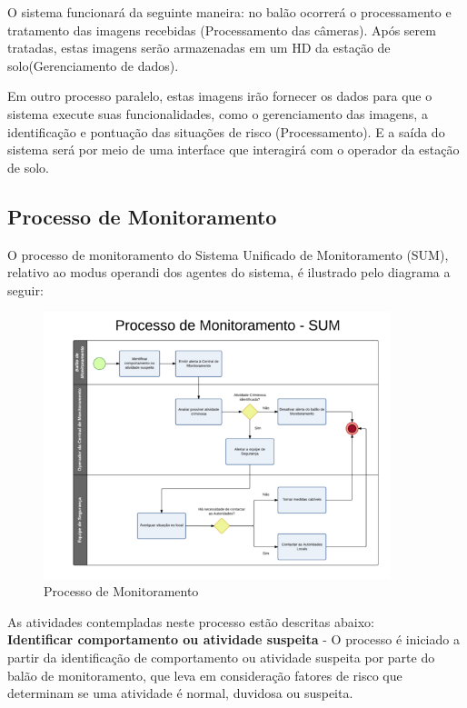 O sistema funcionará da seguinte maneira: no balão ocorrerá o processamento e tratamento das imagens recebidas (Processamento das câmeras). Após serem tratadas, estas imagens serão armazenadas em um HD da estação de solo(Gerenciamento de dados).

Em outro processo paralelo, estas imagens  irão fornecer os dados para que o sistema execute suas funcionalidades, como o gerenciamento das imagens, a identificação e pontuação das situações de risco (Processamento). E a saída do sistema será por meio de uma interface que interagirá com o operador da estação de solo.

\subsection{Processo de Monitoramento}
O processo de monitoramento do Sistema Unificado de Monitoramento (SUM), relativo ao modus operandi dos agentes do sistema, é ilustrado pelo diagrama a seguir:

\begin{figure}[H]
\centering
\includegraphics[width=0.9\textwidth]{figuras/Processodemonitorament}
\caption{Processo de Monitoramento}
\label{img:Processo de Monitoramento}
\end{figure}
As atividades contempladas neste processo estão descritas abaixo:
\\

\textbf{Identificar comportamento ou atividade suspeita} - O processo é iniciado a partir da identificação de comportamento ou atividade suspeita por parte do balão de monitoramento, que leva em consideração fatores de risco que determinam se uma atividade é normal, duvidosa ou suspeita.
\\


